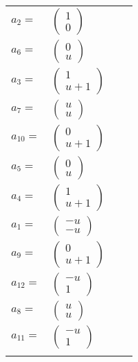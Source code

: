 \documentclass[1p]{elsarticle_modified}
\theoremstyle{definition}
\begin{document}
\begin{tabular}{m{7pt} m{180pt} m{7pt} m{180pt} }
\flushright $a_{2}=$&$\begin{pmatrix}1\\0\end{pmatrix}$ \\
\flushright $a_{6}=$&$\begin{pmatrix}0\\u\end{pmatrix}$ \\
\flushright $a_{3}=$&$\begin{pmatrix}1\\u+1\end{pmatrix}$ \\
\flushright $a_{7}=$&$\begin{pmatrix}u\\u\end{pmatrix}$ \\
\flushright $a_{10}=$&$\begin{pmatrix}0\\u+1\end{pmatrix}$ \\
\flushright $a_{5}=$&$\begin{pmatrix}0\\u\end{pmatrix}$ \\
\flushright $a_{4}=$&$\begin{pmatrix}1\\u+1\end{pmatrix}$ \\
\flushright $a_{1}=$&$\begin{pmatrix}- u\\- u\end{pmatrix}$ \\
\flushright $a_{9}=$&$\begin{pmatrix}0\\u+1\end{pmatrix}$ \\
\flushright $a_{12}=$&$\begin{pmatrix}- u\\1\end{pmatrix}$ \\
\flushright $a_{8}=$&$\begin{pmatrix}u\\u\end{pmatrix}$ \\
\flushright $a_{11}=$&$\begin{pmatrix}- u\\1\end{pmatrix}$\\&\end{tabular}
\end{document}
